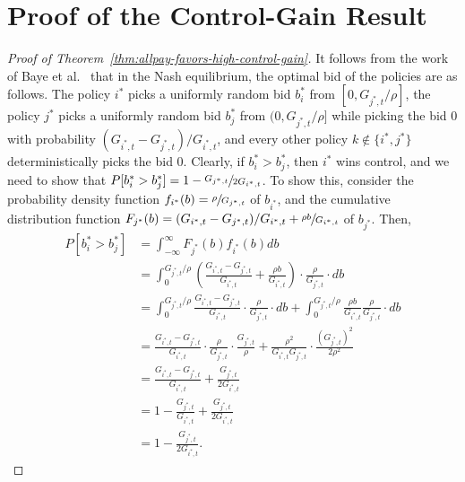 \section{Proof of the \allpay Control-Gain Result}
\label{app:allpay-control-gain-proof}

\begin{proof}[Proof of Theorem~\ref{thm:allpay-favors-high-control-gain}]
	It follows from the work of Baye et al.~\cite{baye1996all} that in the Nash equilibrium, the optimal bid of the policies are as follows.
	The policy $i^*$ picks a uniformly random bid $b_i^*$ from $[0,G_{j^*,t}/\rho]$, the policy $j^*$ picks a uniformly random bid $b_j^*$ from $(0,G_{j^*,t}/\rho]$ while picking the bid $0$ with probability $(G_{i^*,t} - G_{j^*,t})/G_{i^*,t}$, and every other policy $k\notin\{i^*,j^*\}$ deterministically picks the bid $0$.
	Clearly, if $b_i^*>b_j^*$, then $i^*$ wins control, and we need to show that $P[b_i^* > b_j^*]  = 1- \sfrac{G_{j^*,t}}{2G_{i^*,t}}$.
	To show this, consider the probability density function $f_{i^*}(b) = \sfrac{\rho }{G_{j^*,t}}$ of $b_{i^*}$, and the cumulative distribution function $F_{j^*}(b) = (G_{i^*,t} - G_{j^*,t})/G_{i^*,t} + \sfrac{\rho b}{G_{i^*,t}}$ of $b_{j^*}$.
	Then,
	\begin{align*}
		P[b_i^* > b_j^*] 
		&= \int_{-\infty}^\infty F_{j^*}(b)f_{i^*}(b)db\\
		&= \int_{0}^{G_{j^*,t}/\rho} \left(\frac{G_{i^*,t} - G_{j^*,t}}{G_{i^*,t}} + \frac{\rho b}{G_{i^*,t}}\right)\cdot \frac{\rho }{G_{j^*,t}} \cdot db \\
		&= \int_{0}^{G_{j^*,t}/\rho} \frac{G_{i^*,t} - G_{j^*,t}}{G_{i^*,t}} \cdot \frac{\rho }{G_{j^*,t}} \cdot db
		+ \int_{0}^{G_{j^*,t}/\rho} \frac{\rho b}{G_{i^*,t}}\frac{\rho }{G_{j^*,t}} \cdot db\\
		&=  \frac{G_{i^*,t} - G_{j^*,t}}{G_{i^*,t}} \cdot \frac{\rho }{G_{j^*,t}} \cdot \frac{G_{j^*,t}}{\rho}
		+ \frac{\rho^2}{G_{i^*,t}G_{j^*,t}}\cdot \frac{\left(G_{j^*,t}\right)^2}{2\rho^2}\\
		&= \frac{G_{i^*,t} - G_{j^*,t}}{G_{i^*,t}} + \frac{G_{j^*,t}}{2G_{i^*,t}}\\
		&= 1-\frac{G_{j^*,t}}{G_{i^*,t}} + \frac{G_{j^*,t}}{2G_{i^*,t}}\\
		&= 1-\frac{G_{j^*,t}}{2G_{i^*,t}}.
	\end{align*}
\end{proof}
